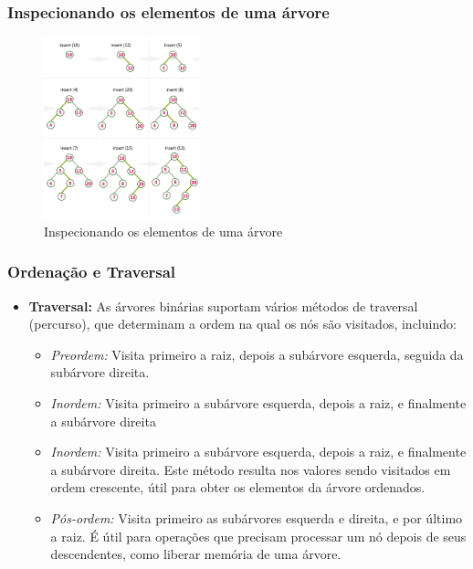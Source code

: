 \begin{frame}[fragile]
  \frametitle{Inspecionando os elementos de uma árvore}
  \begin{figure}
    \centering
    \includegraphics[width=0.4\textwidth]{assets/aula5-arvores5.png}
    \caption{Inspecionando os elementos de uma árvore}
  \end{figure}
\end{frame}
\begin{frame}[fragile]
  \frametitle{Ordenação e Traversal}
  \begin{itemize}
    \item \textbf{Traversal:} As árvores binárias suportam vários métodos de traversal (percurso), que determinam a ordem na qual os nós são visitados, incluindo:
      \begin{itemize}
        \item \textit{Preordem:} Visita primeiro a raiz, depois a subárvore esquerda, seguida da subárvore direita.
        \item \textit{Inordem:} Visita primeiro a subárvore esquerda, depois a raiz, e finalmente a subárvore direita
        \item \textit{Inordem:} Visita primeiro a subárvore esquerda, depois a raiz, e finalmente a subárvore direita. Este método resulta nos valores sendo visitados em ordem crescente, útil para obter os elementos da árvore ordenados.
        \item \textit{Pós-ordem:} Visita primeiro as subárvores esquerda e direita, e por último a raiz. É útil para operações que precisam processar um nó depois de seus descendentes, como liberar memória de uma árvore.
      \end{itemize}
  \end{itemize}
\end{frame}
